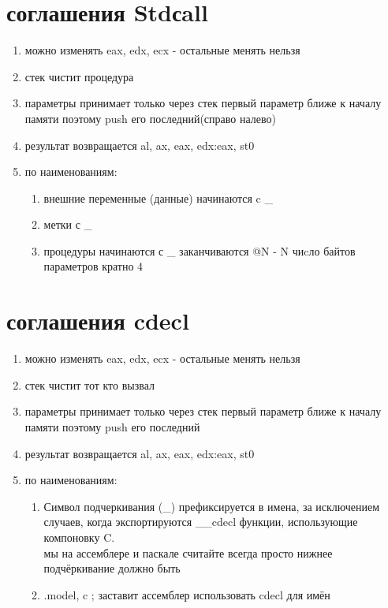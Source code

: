 \documentclass[a4paper,10pt]{article}
\begin{document}
\section*{соглашения Stdсall}
\begin{enumerate}
    \item можно изменять eax, edx, ecx - остальные менять нельзя
    \item стек чистит процедура
    \item параметры принимает только через стек первый параметр ближе к началу памяти поэтому push его последний(справо налево)
    \item результат возвращается al, ax, eax, edx:eax, st0
    \item по наименованиям:
    \begin{enumerate}
        \item внешние переменные (данные) начинаются c \_
        \item метки с \_
        \item процедуры начинаются с \_ заканчиваются @N - N чиcло байтов параметров кратно 4
    \end{enumerate}
\end{enumerate}
\section*{соглашения cdecl}
\begin{enumerate}
    \item можно изменять eax, edx, ecx - остальные менять нельзя
    \item стек чистит тот кто вызвал
    \item параметры принимает только через стек первый параметр ближе к началу памяти поэтому push его последний
    \item результат возвращается al, ax, eax, edx:eax, st0
    \item по наименованиям:
    \begin{enumerate}
        \item Символ подчеркивания (\_) префиксируется в имена, за исключением случаев, когда экспортируются \_\_cdecl функции, использующие компоновку C. \\
        мы на ассемблере и паскале считайте всегда просто нижнее подчёркивание должно быть
        \item .model, c ; заставит ассемблер использовать cdecl для имён
    \end{enumerate}
\end{enumerate}
\end{document}
